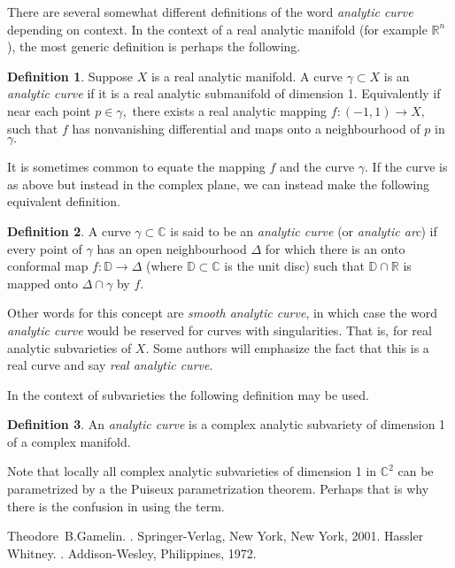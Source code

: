\documentclass[12pt]{article}
\theoremstyle{theorem}
\theoremstyle{definition}
\newtheorem*{defn}{Definition}
\theoremstyle{remark}
\begin{document}
There are several somewhat different definitions of the word \emph{analytic curve} depending on context.  
In the context of a real analytic manifold (for example ${\mathbb{R}}^n$), the most generic
definition is perhaps the following.

\begin{defn}
Suppose $X$ is a real analytic manifold.
A curve $\gamma \subset X$ is an \emph{analytic curve} if it is a real analytic submanifold
of dimension 1.  Equivalently if near each point $p \in \gamma,$
there exists a real analytic mapping
$f \colon (-1,1) \to X,$ such that $f$ has nonvanishing differential and maps onto a neighbourhood of $p$ in $\gamma .$ 
\end{defn}

It is sometimes common to equate the mapping $f$ and the curve $\gamma$.
If the curve is as above but instead in the complex plane, we can instead make the following equivalent definition.

\begin{defn}
A curve $\gamma \subset \mathbb{C}$ is said to be an {\em analytic curve} (or {\em analytic arc}) if every point of $\gamma$ has an open neighbourhood $\Delta$ for which there is an
onto conformal map $f \colon {\mathbb{D}} \to \Delta$ (where ${\mathbb{D}} \subset \mathbb{C}$ is
the unit disc) such that ${\mathbb{D}} \cap {\mathbb{R}}$ is mapped
onto $\Delta \cap \gamma$ by $f.$
\end{defn}

Other words for this concept are \emph{smooth analytic curve}, in which case the word \emph{analytic curve}
would be reserved for curves with singularities.  That is, for real analytic subvarieties of $X$.  Some authors will emphasize the fact that this is a real curve and say \emph{real analytic curve}.

In the context of subvarieties the following definition may be used.

\begin{defn}
An \emph{analytic curve} is a complex analytic subvariety of dimension 1 of a complex manifold.
\end{defn}

Note that locally all complex analytic subvarieties of dimension 1 in ${\mathbb{C}}^2$ can be parametrized by a the Puiseux parametrization theorem.  Perhaps that is why there is the confusion in using the term.

\begin{thebibliography}{9}
Theodore~B.\@ Gamelin.
{\em {}}.
Springer-Verlag, New York, New York, 2001.
Hassler Whitney.
{\em {}}.
Addison-Wesley, Philippines, 1972.
\end{thebibliography}
\end{document}
